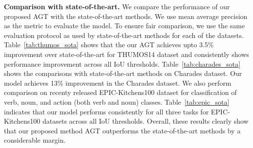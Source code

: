 \documentclass[10pt,twocolumn,letterpaper]{article}
\begin{document}
 \vspace{0.05in}
\noindent
\textbf{Comparison with state-of-the-art. } We compare the performance of our proposed AGT with the state-of-the-art methods. We use mean average precision as the metric to evaluate the model. To ensure fair comparison, we use the same evaluation protocol as used by state-of-the-art methods for each of the datasets. Table~\ref{tab:thumos_sota} shows that the our AGT achieves upto 3.5\% improvement over state-of-the-art for THUMOS14 dataset and consistently shows performance improvement  across all IoU thresholds. Table~\ref{tab:charades_sota} shows the comparisons with state-of-the-art methods on Charades dataset. Our model achieves 13\% improvement in the Charades dataset. We also perform comparison on recenty released EPIC-Kitchens100 dataset for classification of verb, noun, and action (\ie both verb and noun) classes. Table~\ref{tab:epic_sota} indicates that our model performs consistently for all three tasks for EPIC-Kitchens100 datasets across all IoU thresholds. Overall, these results clearly show that our proposed method AGT outperforms the state-of-the-art methods by a considerable margin. 
\setlength{\tabcolsep}{4pt}
\renewcommand{\arraystretch}{0.95}
\begin{table}[t]
\centering
\caption{\textbf{Comparison with state-of-the-art (Charades).} We report mean average precision (mAP) computed using \texttt{Charades\_v1\_localize} setting in ~\cite{sigurdsson2016hollywood}. : higher is better.}
\label{tab:charades_sota}
\end{table}
\end{document}
